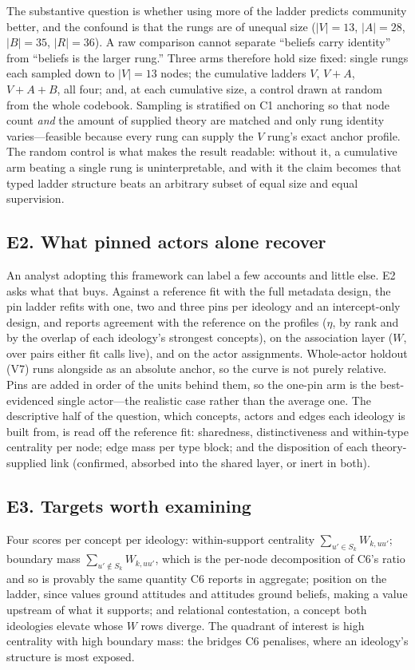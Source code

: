 \documentclass[11pt]{article}
\newcommand{\1}{\mathbb{1}}
\begin{document}
The substantive question is whether using more of the ladder predicts community better, and
the confound is that the rungs are of unequal size ($|V|=13$, $|A|=28$, $|B|=35$, $|R|=36$).
A raw comparison cannot separate ``beliefs carry identity'' from ``beliefs is the larger
rung.'' Three arms therefore hold size fixed: single rungs each sampled down to $|V|=13$
nodes; the cumulative ladders $V$, $V{+}A$, $V{+}A{+}B$, all four; and, at each cumulative
size, a control drawn at random from the whole codebook. Sampling is stratified on C1
anchoring so that node count \emph{and} the amount of supplied theory are matched and only
rung identity varies---feasible because every rung can supply the $V$ rung's exact anchor
profile. The random control is what makes the result readable: without it, a cumulative arm
beating a single rung is uninterpretable, and with it the claim becomes that typed ladder
structure beats an arbitrary subset of equal size and equal supervision.

\subsection*{E2. What pinned actors alone recover}
An analyst adopting this framework can label a few accounts and little else. E2 asks what
that buys. Against a reference fit with the full metadata design, the pin ladder refits with
one, two and three pins per ideology and an intercept-only design, and reports agreement
with the reference on the profiles ($\eta$, by rank and by the overlap of each ideology's
strongest concepts), on the association layer ($W$, over pairs either fit calls live), and
on the actor assignments. Whole-actor holdout (V7) runs alongside as an absolute anchor, so
the curve is not purely relative. Pins are added in order of the units behind them, so the
one-pin arm is the best-evidenced single actor---the realistic case rather than the average
one. The descriptive half of the question, which concepts, actors and edges each ideology is
built from, is read off the reference fit: sharedness, distinctiveness and within-type
centrality per node; edge mass per type block; and the disposition of each theory-supplied
link (confirmed, absorbed into the shared layer, or inert in both).

\subsection*{E3. Targets worth examining}
Four scores per concept per ideology: within-support centrality $\sum_{u'\in S_k}W_{k,uu'}$;
boundary mass $\sum_{u'\notin S_k}W_{k,uu'}$, which is the per-node decomposition of C6's
ratio and so is provably the same quantity C6 reports in aggregate; position on the ladder,
since values ground attitudes and attitudes ground beliefs, making a value upstream of what
it supports; and relational contestation, a concept both ideologies elevate whose $W$ rows
diverge. The quadrant of interest is high centrality with high boundary mass: the bridges
C6 penalises, where an ideology's structure is most exposed.
\end{document}

